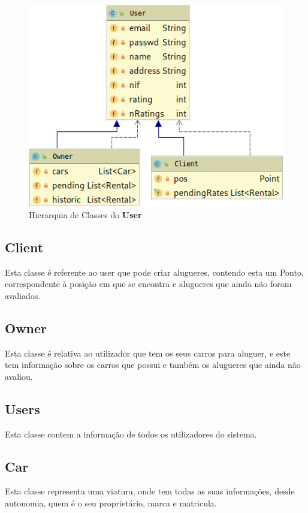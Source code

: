 \documentclass[a4paper]{report}
\begin{document}
\begin{figure}[h]
    \centering
    \includegraphics[scale=0.5]{hierarquiaUser.png}
    \caption{Hierarquia de Classes do \textbf{User}}
\end{figure}

\subsection{Client}

Esta classe é referente ao user que pode criar alugueres, contendo
esta um Ponto, correspondente à posição em que se encontra e alugueres
que ainda não foram avaliados.

\subsection{Owner}

Esta classe é relativa ao utilizador que tem os seus carros para aluguer,
e este tem informação sobre os carros que possui e também os alugueres
que ainda não avaliou.

\subsection{Users}

Esta classe contem a informação de todos os utilizadores do sistema.

\subsection{Car}\label{chap:car}

Esta classe representa uma viatura, onde tem todas as suas informações,
desde autonomia, quem é o seu proprietário, marca e matricula.
\end{document}
